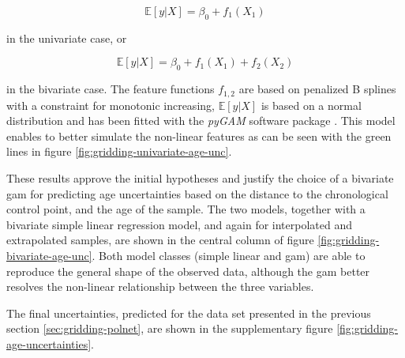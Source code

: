 \begin{refsection}
\begin{equation*}
	\mathbb{E}[y|X] = \beta_0+f_1(X_1)
\end{equation*}

in the univariate case, or

\begin{equation*}
\mathbb{E}[y|X] = \beta_0+f_1(X_1)+f_2(X_2)
\end{equation*}

in the bivariate case. The feature functions $f_{1,2}$ are based on penalized B splines with a constraint for monotonic increasing, $\mathbb{E}[y|X]$ is based on a normal distribution and has been fitted with the \textit{pyGAM} software package \citep{ServenBrummittAbedi2018}. This model enables to better simulate the non-linear features as can be seen with the green lines in figure \ref{fig:gridding-univariate-age-unc}.

These results approve the initial hypotheses and justify the choice of a bivariate \gls{gam} for predicting age uncertainties based on the distance to the chronological control point, and the age of the sample. The two models, together with a bivariate simple linear regression model, and again for interpolated and extrapolated samples, are shown in the central column of figure \ref{fig:gridding-bivariate-age-unc}. Both model classes (simple linear and \gls{gam}) are able to reproduce the general shape of the observed data, although the \gls{gam} better resolves the non-linear relationship between the three variables.

The final uncertainties, predicted for the data set presented in the previous section \ref{sec:gridding-polnet}, are shown in the supplementary figure \ref{fig:gridding-age-uncertainties}.


\end{refsection}
